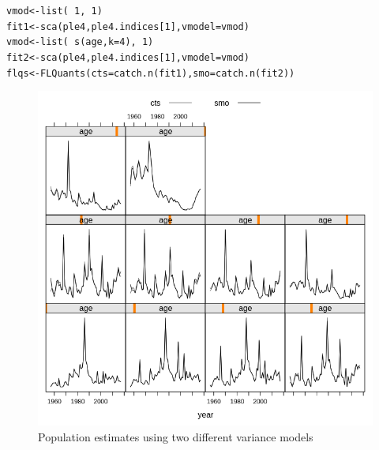 \documentclass[a4paper,english,10pt]{article}\usepackage[]{graphicx}\usepackage[]{color}
\makeatletter
\newcommand{\hlnum}[1]{\textcolor[rgb]{0.063,0.58,0.627}{#1}}%
\newcommand{\hlopt}[1]{\textcolor[rgb]{0.196,0.196,0.196}{#1}}%
\newcommand{\hlstd}[1]{\textcolor[rgb]{0.196,0.196,0.196}{#1}}%
\newcommand{\hlkwb}[1]{\textcolor[rgb]{0.627,0,0.314}{#1}}%
\newcommand{\hlkwc}[1]{\textcolor[rgb]{0,0.631,0.314}{#1}}%
\newcommand{\hlkwd}[1]{\textcolor[rgb]{0.78,0.227,0.412}{#1}}%
\newenvironment{kframe}{%
 \def\at@end@of@kframe{}%
 \ifinner\ifhmode%
  \def\at@end@of@kframe{\end{minipage}}%
  \begin{minipage}{\columnwidth}%
 \fi\fi%
 \def\FrameCommand##1{\hskip\@totalleftmargin \hskip-\fboxsep
 \colorbox{shadecolor}{##1}\hskip-\fboxsep
     \hskip-\linewidth \hskip-\@totalleftmargin \hskip\columnwidth}%
 \MakeFramed {\advance\hsize-\width
   \@totalleftmargin\z@ \linewidth\hsize
   \@setminipage}}%
 {\par\unskip\endMakeFramed%
 \at@end@of@kframe}
\newenvironment{knitrout}{}{} %
\makeatother
\begin{document}
\begin{knitrout}
\color{fgcolor}\begin{kframe}
\begin{alltt}
\hlstd{vmod} \hlkwb{<-} \hlkwd{list}\hlstd{(}\hlopt{~}\hlnum{1}\hlstd{,} \hlopt{~}\hlnum{1}\hlstd{)}
\hlstd{fit1} \hlkwb{<-} \hlkwd{sca}\hlstd{(ple4, ple4.indices[}\hlnum{1}\hlstd{],} \hlkwc{vmodel} \hlstd{= vmod)}
\hlstd{vmod} \hlkwb{<-} \hlkwd{list}\hlstd{(}\hlopt{~}\hlkwd{s}\hlstd{(age,} \hlkwc{k} \hlstd{=} \hlnum{4}\hlstd{),} \hlopt{~}\hlnum{1}\hlstd{)}
\hlstd{fit2} \hlkwb{<-} \hlkwd{sca}\hlstd{(ple4, ple4.indices[}\hlnum{1}\hlstd{],} \hlkwc{vmodel} \hlstd{= vmod)}
\hlstd{flqs} \hlkwb{<-} \hlkwd{FLQuants}\hlstd{(}\hlkwc{cts} \hlstd{=} \hlkwd{catch.n}\hlstd{(fit1),} \hlkwc{smo} \hlstd{=} \hlkwd{catch.n}\hlstd{(fit2))}
\end{alltt}
\end{kframe}
\end{knitrout}

\begin{knitrout}
\color{fgcolor}\begin{figure}[H]

{\centering \includegraphics[width=.9\linewidth]{figure/varmod-1} 

}

\caption[Population estimates using two different variance models]{Population estimates using two different variance models}\label{fig:varmod}
\end{figure}


\end{knitrout}
\end{document}
